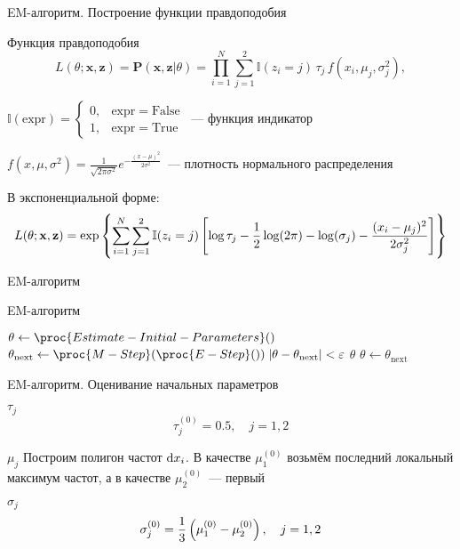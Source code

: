 \documentclass[utf8]{beamer}
\begin{document}
\begin{frame}{EM-алгоритм. Построение функции правдоподобия}
\begin{block}{Функция правдоподобия}
  $$
  L(\theta; \mathbf{x}, \mathbf{z}) = 
    \mathbf{P}(\mathbf{x}, \mathbf{z} \vert \theta) = 
    \prod\limits_{i=1}^{N} \sum\limits_{j=1}^2 
      \mathbb{I}(z_i=j) \, \tau_j \, f(x_i,\mu_j,\sigma_j^2),
  $$

{\footnotesize
$\mathbb{I}(\mathrm{expr}) = \left\{
  \begin{array}{rl}
    0, & \mathrm{expr} = \mathrm{False} \\
    1, & \mathrm{expr} = \mathrm{True}
  \end{array}\right.$~--- функция индикатор

$f(x, \mu, \sigma^2) = 
    \frac{1}{\sqrt{2 \pi \sigma^2}} e^{-\frac{(x - \mu)^2}{2 \sigma^2}}$~---
плотность нормального распределения
}
\end{block}

В экспоненциальной форме:
{\small
$$
L(\theta; \mathbf{x}, \mathbf{z}) =
  \exp \cbr{ \sum\limits_{i=1}^{N} \sum\limits_{j=1}^2 
    \mathbb{I}(z_i=j) \sbr{
      \log \tau_j - 
      \frac{1}{2}\log(2\pi) -
      \log(\sigma_j) -
      \frac{(x_i - \mu_j)^2}{2 \sigma_j^2}}}
$$}
\end{frame}


\begin{frame}{EM-алгоритм}
\begin{block}{EM-алгоритм}
\begin{codebox}
\li $\theta \gets \proc{Estimate-Initial-Parameters}()$
\li \While {}
\li \Do
      $\theta_{\mathrm{next}} \gets \proc{M-Step}(\proc{E-Step}())$
\li   \If $\envert{\theta - \theta_{\mathrm{next}}} < \varepsilon$
\li   \Then
        \Return $\theta$
\li   \Else
        $\theta \gets \theta_{\mathrm{next}}$
      \End
    \End
\end{codebox}
\end{block}
\end{frame}


\begin{frame}{EM-алгоритм. Оценивание начальных параметров}
\begin{block}{$\tau_j$}
$$
\tau_j^{(0)} = 0.5, \quad j=1,2
$$
\end{block}
\begin{block}{$\mu_j$}
Построим полигон частот $\dif x_i$.
В качестве $\mu_1^{(0)}$ возьмём последний локальный максимум частот,
а в качестве $\mu_2^{(0)}$~--- первый
\end{block}
\begin{block}{$\sigma_j$}
$$\sigma_j^{(0)} = \frac{1}{3}\del{\mu_1^{(0)} - \mu_2^{(0)}}, \quad j=1, 2$$
\end{block}
\end{frame}
\end{document}
